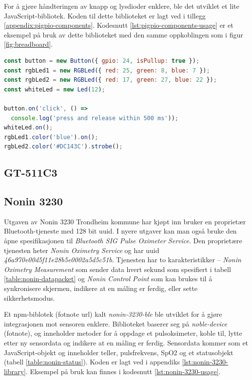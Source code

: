 For å gjøre håndteringen av knapp og lysdioder enklere, ble det utviklet et lite JavaScript-bibliotek.
Koden til dette biblioteket er lagt ved i tillegg \ref{appendix:pigpio-components}. Kodesnutt
\ref{lst:pigpio-components-usage} er et eksempel på bruk av dette biblioteket med den samme oppkoblingen som i
figur \ref{fig:breadboard}.

\begin{lstlisting}[frame=single, language=JavaScript,
    caption=Bruk av pigpio-components, label=lst:pigpio-components-usage]
const button = new Button({ gpio: 24, isPullup: true });
const rgbLed1 = new RGBLed({ red: 25, green: 8, blue: 7 });
const rgbLed2 = new RGBLed({ red: 17, green: 27, blue: 22 });
const whiteLed = new Led(12);

button.on('click', () =>
  console.log('press and release within 500 ms'));
whiteLed.on();
rgbLed1.color('blue').on();
rgbLed2.color('#DC143C').strobe();
\end{lstlisting}

\subsection{GT-511C3}


\subsection{Nonin 3230}
Utgaven av Nonin 3230 Trondheim kommune har kjøpt inn bruker en proprietær Bluetooth-tjeneste med 128 bit \gls{uuid}.
I nyere utgaver kan man også bruke den åpne spesifikasjonen til \textit{Bluetooth SIG Pulse Oximeter Service}.
Den proprietære tjenesten heter \textit{Nonin Oximetry Service} og har \gls{uuid} \textit{46a970e00d5f11e28b5e0002a5d5c51b}.
Tjenesten har to karakteristikker -- \textit{Nonin Oximetry Measurement} som sender data hvert sekund som spesifiert
i tabell \ref{table:nonin-datapacket} og \textit{Nonin Control Point} som kan brukes til å synkronisere skjermen,
indikere at en måling er ferdig, eller sette sikkerhetsmodus. 

Et \gls{npm}-biblotek (fotnote url) kalt \textit{nonin-3230-ble} ble utviklet for å gjøre integrasjonen mot sensoren enklere.
Biblioteket baserer seg på \textit{noble-device} (fotnote), og inneholder metoder for å oppdage et pulsoksimeter,
koble til, lytte etter ny sensordata og indikere at en måling er ferdig. Sensordata kommer som et JavaScript-objekt
og inneholder teller, pulsfrekvens, SpO2 og et statusobjekt (tabell \ref{table:nonin-status}).
Koden er lagt ved i appendiks \ref{lst:nonin-3230-library}.
Eksempel på bruk kan finnes i kodesnutt \ref{lst:nonin-3230-usage}.

